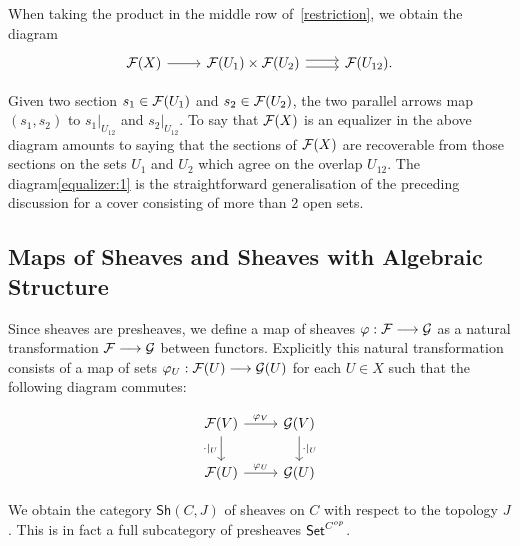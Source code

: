 When taking the product in the middle row of~\ref{restriction}, we obtain the diagram 
\[
	\begin{tikzcd}
		{\Sh{F}(X)} & {\Sh{F}(U_1)\times\Sh{F}(U_2)} & {\Sh{F}(U_{12})}.
		\arrow[from=1-1, to=1-2]
		\arrow[shift right=1, from=1-2, to=1-3]
		\arrow[shift left=1, from=1-2, to=1-3]
	\end{tikzcd}
\]

Given two section $s_1 \in \mathcal{F}(U_1)$ and $s_2 \in \mathcal{F}(U_2)$, the two parallel arrows map $(s_1, s_2)$ to $s_1|_{U_{12}}$ and $s_2|_{U_{12}}$. To say that $\mathcal{F}(X)$ is an equalizer in the above diagram amounts to saying that the sections of $\mathcal{F}(X)$ are recoverable from those sections on the sets $U_1$ and $U_2$ which agree on the overlap $U_{12}$. The diagram\eqref{equalizer:1} is the straightforward generalisation of the preceding discussion for a cover consisting of more than 2 open sets.

\subsection{Maps of Sheaves and Sheaves with Algebraic Structure}
Since sheaves are presheaves, we define a map of sheaves $\varphi: \mathcal{F} \longrightarrow \mathcal{G}$ as a natural transformation $\mathcal{F} \longrightarrow \mathcal{G}$ between functors. Explicitly this natural transformation consists of a map of sets $\varphi_U: \mathcal{F}(U) \longrightarrow \mathcal{G}(U)$ for each $U \in X$ such that the following diagram commutes:

\[
	\begin{tikzcd}
		{\Sh{F}(V)} & {\Sh{G}(V)} \\
		{\Sh{F}(U)} & {\Sh{G}(U)}
		\arrow["{\cdot|_U}"', from=1-1, to=2-1]
		\arrow["{\varphi_V}", from=1-1, to=1-2]
		\arrow["{\cdot|_U}", from=1-2, to=2-2]
		\arrow["{\varphi_U}", from=2-1, to=2-2]
	\end{tikzcd}
\]

We obtain the category $\mathsf{Sh}(C,J)$ of sheaves on $C$ with respect to the topology $J$. This is in fact a full subcategory of presheaves $\mathsf{Set}^{C^{op}}$.\par


